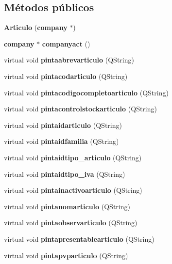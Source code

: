 \subsection*{M\'{e}todos p\'{u}blicos}
\begin{CompactItemize}
\item 
{\bf Articulo} ({\bf company} $\ast$)\label{classArticulo_a0}

\item 
{\bf company} $\ast$ {\bf companyact} ()\label{classArticulo_a1}

\item 
virtual void {\bf pintaabrevarticulo} (QString)\label{classArticulo_a2}

\item 
virtual void {\bf pintacodarticulo} (QString)\label{classArticulo_a3}

\item 
virtual void {\bf pintacodigocompletoarticulo} (QString)\label{classArticulo_a4}

\item 
virtual void {\bf pintacontrolstockarticulo} (QString)\label{classArticulo_a5}

\item 
virtual void {\bf pintaidarticulo} (QString)\label{classArticulo_a6}

\item 
virtual void {\bf pintaidfamilia} (QString)\label{classArticulo_a7}

\item 
virtual void {\bf pintaidtipo\_\-articulo} (QString)\label{classArticulo_a8}

\item 
virtual void {\bf pintaidtipo\_\-iva} (QString)\label{classArticulo_a9}

\item 
virtual void {\bf pintainactivoarticulo} (QString)\label{classArticulo_a10}

\item 
virtual void {\bf pintanomarticulo} (QString)\label{classArticulo_a11}

\item 
virtual void {\bf pintaobservarticulo} (QString)\label{classArticulo_a12}

\item 
virtual void {\bf pintapresentablearticulo} (QString)\label{classArticulo_a13}

\item 
virtual void {\bf pintapvparticulo} (QString)\label{classArticulo_a14}


\end{CompactItemize}
